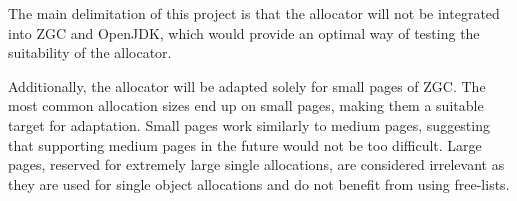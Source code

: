 
The main delimitation of this project is that the allocator will not be integrated into ZGC and OpenJDK, which would provide an optimal way of testing the suitability of the allocator.

Additionally, the allocator will be adapted solely for small pages of ZGC. The most common allocation sizes end up on small pages, making them a suitable target for adaptation. Small pages work similarly to medium pages, suggesting that supporting medium pages in the future would not be too difficult. Large pages, reserved for extremely large single allocations, are considered irrelevant as they are used for single object allocations and do not benefit from using free-lists.

